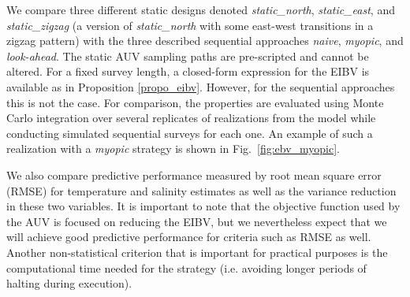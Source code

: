 \documentclass[aoas]{imsart}
\begin{document}
We compare three different static designs denoted
\textit{static\_north}, \textit{static\_east}, and
\textit{static\_zigzag} (a version of \textit{static\_north} with some east-west transitions in a zigzag pattern) with the three described sequential approaches
\textit{naive}, \textit{myopic}, and \textit{look-ahead}. The static
AUV sampling paths are pre-scripted and cannot be altered.
For a fixed survey length, a closed-form expression for the EIBV is
available as in Proposition \ref{propo_eibv}. However, for the sequential
approaches this is not the case. For comparison, the properties are
evaluated using Monte Carlo integration over several replicates
of realizations from the model while conducting simulated sequential
surveys for each one. An example of such a realization with a \textit{myopic}
strategy is shown in Fig.~\ref{fig:ebv_myopic}. 

We also compare predictive
performance measured by root mean square error (RMSE) for temperature
and salinity estimates as well as the variance reduction in these
two variables. It is important to note that the objective function
used by the AUV is focused on reducing the
EIBV, but we nevertheless expect that we will achieve good predictive
performance for criteria such as RMSE as well. Another non-statistical
criterion that is important for practical purposes is the computational time needed for the strategy (i.e. avoiding longer periods of halting during execution).
\end{document}
